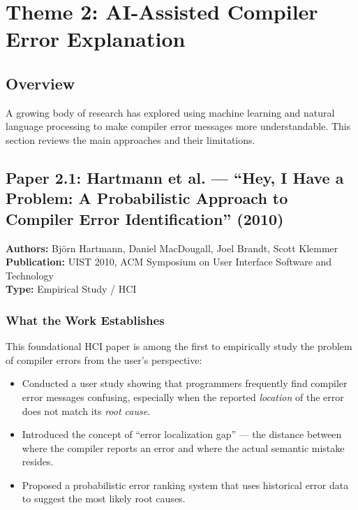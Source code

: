 \documentclass[a4paper,11pt]{article}
\begin{document}
\newpage

\section{Theme 2: AI-Assisted Compiler Error Explanation}

\subsection{Overview}

A growing body of research has explored using machine learning and natural language processing to make compiler error messages more understandable. This section reviews the main approaches and their limitations.

\subsection{Paper 2.1: Hartmann et al. --- ``Hey, I Have a Problem: A Probabilistic Approach to Compiler Error Identification'' (2010)}

\begin{tcolorbox}[colback=gray!5, colframe=gray!40]
\textbf{Authors:} Björn Hartmann, Daniel MacDougall, Joel Brandt, Scott Klemmer \\
\textbf{Publication:} UIST 2010, ACM Symposium on User Interface Software and Technology \\
\textbf{Type:} Empirical Study / HCI
\end{tcolorbox}

\subsubsection{What the Work Establishes}

This foundational HCI paper is among the first to empirically study the problem of compiler errors from the user's perspective:
\begin{itemize}
    \item Conducted a user study showing that programmers frequently find compiler error messages confusing, especially when the reported \textit{location} of the error does not match its \textit{root cause}.
    \item Introduced the concept of ``error localization gap'' --- the distance between where the compiler reports an error and where the actual semantic mistake resides.
    \item Proposed a probabilistic error ranking system that uses historical error data to suggest the most likely root causes.
\end{itemize}
\end{document}
